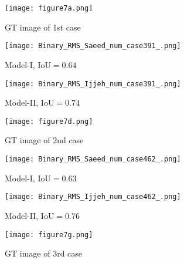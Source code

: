 \begin{sloppypar}
	
	\begin{figure}[ht!]
		\centering
		\begin{subfigure}[b]{0.32\textwidth}
			\centering
			\texttt{[image: figure7a.png]}
			\caption{GT image of 1st case}
			\label{fig:num_GT_391}
		\end{subfigure}
		\hfill
		\begin{subfigure}[b]{0.32\textwidth}
			\centering
			\texttt{[image: Binary\_RMS\_Saeed\_num\_case391\_.png]}
			\caption{Model-I, IoU\(=0.64\)}
			\label{fig:Convlstm_binary_RMS_391}
		\end{subfigure}
		\hfill
		\begin{subfigure}[b]{0.32\textwidth}
			\centering
			\texttt{[image: Binary\_RMS\_Ijjeh\_num\_case391\_.png]}
			\caption{Model-II, IoU\(=0.74\)}
			\label{fig:AE_binary_RMS_391}
		\end{subfigure}
		\par\medskip
		\begin{subfigure}[b]{0.32\textwidth}
			\centering
			\texttt{[image: figure7d.png]}
			\caption{GT image of 2nd case}
			\label{fig:num_GT_462}
		\end{subfigure}
		\hfill
		\begin{subfigure}[b]{0.32\textwidth}
			\centering
			\texttt{[image: Binary\_RMS\_Saeed\_num\_case462\_.png]}
			\caption{Model-I, IoU\(=0.63\)}
			\label{fig:Convlstm_binary_RMS_462}
		\end{subfigure}
		\hfill
		\begin{subfigure}[b]{0.32\textwidth}
			\centering
			\texttt{[image: Binary\_RMS\_Ijjeh\_num\_case462\_.png]}
			\caption{Model-II, IoU\(=0.76\)}
			\label{fig:AE_binary_RMS_462}
		\end{subfigure}
		\par\medskip
		\begin{subfigure}[b]{0.32\textwidth}
			\centering
			\texttt{[image: figure7g.png]}
			\caption{GT image of 3rd case}
			\label{fig:num_GT_453}
		\end{subfigure}
		\hfill	
		\begin{subfigure}[b]{0.32\textwidth}

\end{subfigure}
\end{figure}
\end{sloppypar}
